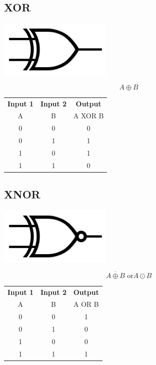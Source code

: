 \documentclass[11pt]{book}
\begin{document}
\subsection{XOR}
\begin{center}
	\includegraphics{figures/20.06.png}
\end{center}
\begin{equation}
	A \oplus B
\end{equation}
\begin{center}
	\begin{tabular}{c c c}
		\textbf{Input 1} &  \textbf{Input 2} & \textbf{Output} \\
		A & B & A XOR B \\
		0 & 0 & 0 \\
		0 & 1 & 1 \\
		1 & 0 & 1 \\
		1 & 1 & 0
	\end{tabular}
\end{center}

\newpage

\subsection{XNOR}
\begin{center}
	\includegraphics{figures/20.07.png}
\end{center}
\begin{equation}
	\overline{A\oplus B} \text{ or} A \odot B
\end{equation}
\begin{center}
	\begin{tabular}{c c c}
		\textbf{Input 1} &  \textbf{Input 2} & \textbf{Output} \\
		A & B & A OR B \\
		0 & 0 & 1 \\
		0 & 1 & 0 \\
		1 & 0 & 0 \\
		1 & 1 & 1
	\end{tabular}
\end{center}
\end{document}
